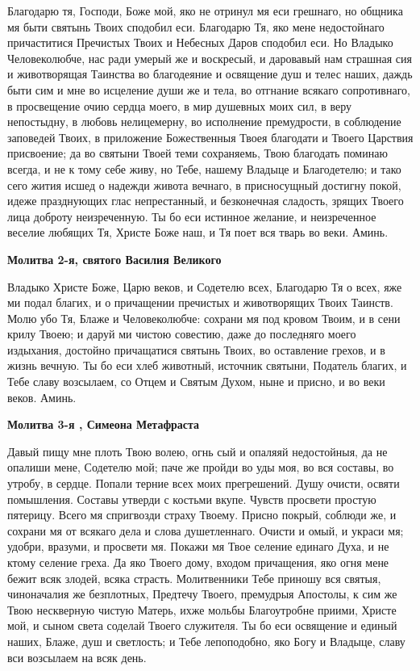 Благодарю тя, Господи, Боже мой, яко не отринул мя еси грешнаго, но общника мя быти святынь Твоих сподобил еси. Благодарю Тя, яко мене недостойнаго причаститися Пречистых Твоих и Небесных Даров сподобил еси. Но Владыко Человеколюбче, нас ради умерый же и воскресый, и даровавый нам страшная сия и животворящая Таинства во благодеяние и освящение душ и телес наших, даждь быти сим и мне во исцеление души же и тела, во отгнание всякаго сопротивнаго, в просвещение очию сердца моего, в мир душевных моих сил, в веру непостыдну, в любовь нелицемерну, во исполнение премудрости, в соблюдение заповедей Твоих, в приложение Божественныя Твоея благодати и Твоего Царствия присвоение; да во святыни Твоей теми сохраняемь, Твою благодать поминаю всегда, и не к тому себе живу, но Тебе, нашему Владыце и Благодетелю; и тако сего жития исшед о надежди живота вечнаго, в присносущный достигну покой, идеже празднующих глас непрестанный, и безконечная сладость, зрящих Твоего лица доброту неизреченную. Ты бо еси истинное желание, и неизреченное веселие любящих Тя, Христе Боже наш, и Тя поет вся тварь во веки. Аминь.


\medskip
\bfseries Молитва 2-я, святого Василия Великого\normalfont{}\nopagebreak


Владыко Христе Боже, Царю веков, и Содетелю всех, Благодарю Тя о всех, яже ми подал благих, и о причащении пречистых и животворящих Твоих Таинств. Молю убо Тя, Блаже и Человеколюбче: сохрани мя под кровом Твоим, и в сени крилу Твоею; и даруй ми чистою совестию, даже до последняго моего издыхания, достойно причащатися святынь Твоих, во оставление грехов, и в жизнь вечную. Ты бо еси хлеб животный, источник святыни, Податель благих, и Тебе славу возсылаем, со Отцем и Святым Духом, ныне и присно, и во веки веков. Аминь.


\medskip
\bfseries Молитва 3-я , Симеона Метафраста\normalfont{}\nopagebreak


Давый пищу мне плоть Твою волею, огнь сый и опаляяй недостойныя, да не опалиши мене, Содетелю мой; паче же пройди во уды моя, во вся составы, во утробу, в сердце. Попали терние всех моих прегрешений. Душу очисти, освяти помышления. Составы утверди с костьми вкупе. Чувств просвети простую пятерицу. Всего мя спригвозди страху Твоему. Присно покрый, соблюди же, и сохрани мя от всякаго дела и слова душетленнаго. Очисти и омый, и украси мя; удобри, вразуми, и просвети мя. Покажи мя Твое селение единаго Духа, и не ктому селение греха. Да яко Твоего дому, входом причащения, яко огня мене бежит всяк злодей, всяка страсть. Молитвенники Тебе приношу вся святыя, чиноначалия же безплотных, Предтечу Твоего, премудрыя Апостолы, к сим же Твою нескверную чистую Матерь, ихже мольбы Благоутробне приими, Христе мой, и сыном света соделай Твоего служителя. Ты бо еси освящение и единый наших, Блаже, душ и светлость; и Тебе лепоподобно, яко Богу и Владыце, славу вси возсылаем на всяк день.


